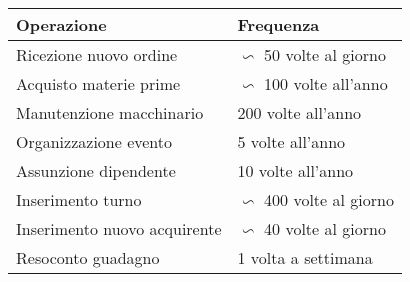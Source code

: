 \begin{center}
	\begin{tabular}{P{9.5cm}P{6cm}}
		\toprule
		 Operazione & Frequenza \\
		\midrule
		Ricezione nuovo ordine & $\backsim$ 50 volte al giorno\\
		\midrule
		Acquisto materie prime & $\backsim$ 100 volte all'anno\\
		\midrule
		Manutenzione macchinario & 200 volte all'anno\\
		\midrule
		Organizzazione evento & 5 volte all'anno\\
		\midrule
		Assunzione dipendente & 10 volte all'anno\\
		\midrule
		Inserimento turno & $\backsim$ 400 volte al giorno\\
		\midrule
		Inserimento nuovo acquirente & $\backsim$ 40 volte al giorno\\
		\midrule
		Resoconto guadagno & 1 volta a settimana\\
		\bottomrule
	\end{tabular}
\end{center}